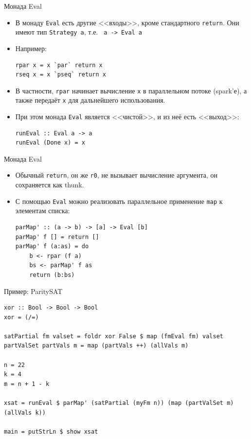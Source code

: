\documentclass[xcolor=dvipsnames]{beamer}
\begin{document}
\begin{frame}[fragile]{Монада Eval}

\begin{itemize}[<+->]
 \item В монаду {\tt Eval} есть другие <<входы>>, кроме стандартного {\tt return}. Они имеют тип \texttt{Strategy a}, т.е.
 \texttt{ a -> Eval a}
 \item Например:
\begin{verbatim}
rpar x = x `par` return x
rseq x = x `pseq` return x
\end{verbatim}
\item В частности, {\tt rpar} начинает вычисление {\tt x} в параллельном потоке (spark'е), а также передаёт {\tt x} для дальнейшего использования.
\item При этом монада {\tt Eval} является <<чистой>>, и из неё есть <<выход>>: 
\begin{verbatim}
runEval :: Eval a -> a
runEval (Done x) = x
\end{verbatim}


\end{itemize}


 \end{frame}

\begin{frame}[fragile]{Монада Eval}
 
 \begin{itemize}[<+->]
 \item Обычный {\tt return}, он же {\tt r0}, не вызывает вычисление аргумента, он сохраняется как thunk.
  \item С помощью {\tt Eval} можно реализовать параллельное применение {\tt map} к элементам списка:
\begin{verbatim}
parMap' :: (a -> b) -> [a] -> Eval [b]
parMap' f [] = return []
parMap' f (a:as) = do
    b <- rpar (f a)
    bs <- parMap' f as
    return (b:bs)
\end{verbatim}

 \end{itemize}

\end{frame}


\begin{frame}[fragile]{Пример: ParitySAT}
 
\scriptsize
\begin{verbatim}
xor :: Bool -> Bool -> Bool
xor = (/=)

satPartial fm valset = foldr xor False $ map (fmEval fm) valset
partValSet partVals m = map (partVals ++) (allVals m)

n = 22
k = 4
m = n + 1 - k

xsat = runEval $ parMap' (satPartial (myFm n)) (map (partValSet m) (allVals k))

main = putStrLn $ show xsat
\end{verbatim}

\end{frame}
\end{document}
